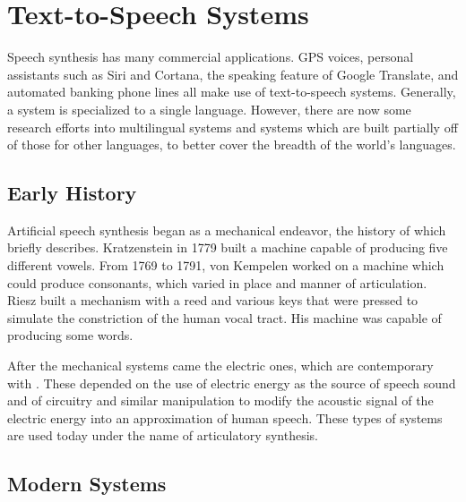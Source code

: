 \documentclass[12pt]{article}
\begin{document}
\section{Text-to-Speech Systems}

Speech synthesis has many commercial applications. GPS voices, personal assistants such as Siri and Cortana, the speaking feature of Google Translate, and automated banking phone lines all make use of text-to-speech systems.  Generally, a system is specialized to a single language. However, there are now some research efforts into multilingual systems and systems which are built partially off of those for other languages, to better cover the breadth of the world's languages.\par

	\subsection{Early History}

	Artificial speech synthesis began as a mechanical endeavor, the history of which \citet{old_flanagan} briefly describes. Kratzenstein in 1779 built a machine capable of producing five different vowels. From 1769 to 1791, von Kempelen worked on a machine which could produce consonants, which varied in place and manner of articulation. Riesz built a mechanism with a reed and various keys that were pressed to simulate the constriction of the human vocal tract. His machine was capable of producing some words. \par

	After the mechanical systems came the electric ones, which are contemporary with \citet{old_flanagan}. These depended on the use of electric energy as the source of speech sound and of circuitry and similar manipulation to modify the acoustic signal of the electric energy into an approximation of human speech. These types of systems are used today under the name of articulatory synthesis. \par

	\subsection{Modern Systems}
\end{document}
